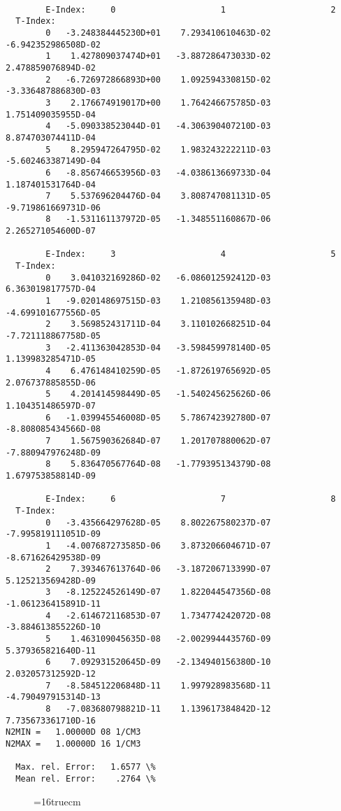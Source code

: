 \documentclass[12pt,dvipdfmx]{article}
\begin{document}
\begin{small}\begin{verbatim}

        E-Index:     0                     1                     2
  T-Index:
        0   -3.248384445230D+01    7.293410610463D-02   -6.942352986508D-02
        1    1.427809037474D+01   -3.887286473033D-02    2.478859076894D-02
        2   -6.726972866893D+00    1.092594330815D-02   -3.336487886830D-03
        3    2.176674919017D+00    1.764246675785D-03    1.751409035955D-04
        4   -5.090338523044D-01   -4.306390407210D-03    8.874703074411D-04
        5    8.295947264795D-02    1.983243222211D-03   -5.602463387149D-04
        6   -8.856746653956D-03   -4.038613669733D-04    1.187401531764D-04
        7    5.537696204476D-04    3.808747081131D-05   -9.719861669731D-06
        8   -1.531161137972D-05   -1.348551160867D-06    2.265271054600D-07

        E-Index:     3                     4                     5
  T-Index:
        0    3.041032169286D-02   -6.086012592412D-03    6.363019817757D-04
        1   -9.020148697515D-03    1.210856135948D-03   -4.699101677556D-05
        2    3.569852431711D-04    3.110102668251D-04   -7.721118867758D-05
        3   -2.411363042853D-04   -3.598459978140D-05    1.139983285471D-05
        4    6.476148410259D-05   -1.872619765692D-05    2.076737885855D-06
        5    4.201414598449D-05   -1.540245625626D-06    1.104351486597D-07
        6   -1.039945546008D-05    5.786742392780D-07   -8.808085434566D-08
        7    1.567590362684D-07    1.201707880062D-07   -7.880947976248D-09
        8    5.836470567764D-08   -1.779395134379D-08    1.679753858814D-09

        E-Index:     6                     7                     8
  T-Index:
        0   -3.435664297628D-05    8.802267580237D-07   -7.995819111051D-09
        1   -4.007687273585D-06    3.873206604671D-07   -8.671626429538D-09
        2    7.393467613764D-06   -3.187206713399D-07    5.125213569428D-09
        3   -8.125224526149D-07    1.822044547356D-08   -1.061236415891D-11
        4   -2.614672116853D-07    1.734774242072D-08   -3.884613855226D-10
        5    1.463109045635D-08   -2.002994443576D-09    5.379365821640D-11
        6    7.092931520645D-09   -2.134940156380D-10    2.032057312592D-12
        7   -8.584512206848D-11    1.997928983568D-11   -4.790497915314D-13
        8   -7.083680798821D-11    1.139617384842D-12    7.735673361710D-16
N2MIN =   1.00000D 08 1/CM3
N2MAX =   1.00000D 16 1/CM3

  Max. rel. Error:   1.6577 \%
  Mean rel. Error:    .2764 \%

\end{verbatim}\end{small}
\begin{figure} \label{2.1.5b}
\epsfxsize=16truecm
\end{figure}
\newpage
\end{document}
